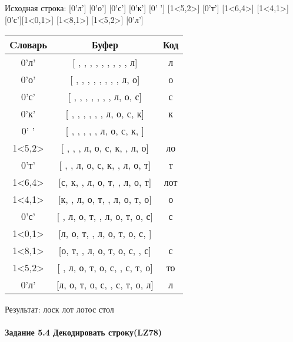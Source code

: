 \documentclass[a4paper, 12pt]{article}
\begin{document}
Исходная строка: [0'л'] [0'о'] [0'с'] [0'к'] [0' '] [1<5,2>] [0'т'] [1<6,4>] [1<4,1>] [0'с'][1<0,1>] [1<8,1>] [1<5,2>] [0'л']\\
\begin{table}[h!]
\centering
\begin{tabular}{|c|c|c|}
\hline
 Cловарь & Буфер & Код  \\ \hline
0'л' & [ ,  ,  ,  ,  ,  ,  ,  ,  , л] & л
\\ \hline
0'о' & [ ,  ,  ,  ,  ,  ,  ,  , л, о] & о
\\ \hline
0'с' & [ ,  ,  ,  ,  ,  ,  , л, о, с] & с
\\ \hline
0'к' & [ ,  ,  ,  ,  ,  , л, о, с, к] & к
\\ \hline
0' ' & [ ,  ,  ,  ,  , л, о, с, к,  ] &  
\\ \hline
1<5,2> & [ ,  ,  , л, о, с, к,  , л, о] & ло
\\ \hline
0'т' & [ ,  , л, о, с, к,  , л, о, т] & т
\\ \hline
1<6,4> & [с, к,  , л, о, т,  , л, о, т] &  лот
\\ \hline
1<4,1> & [к,  , л, о, т,  , л, о, т, о] & о
\\ \hline
0'с' & [ , л, о, т,  , л, о, т, о, с] & с
\\ \hline
1<0,1> & [л, о, т,  , л, о, т, о, с,  ] &  
\\ \hline
1<8,1> & [о, т,  , л, о, т, о, с,  , с] & с
\\ \hline
1<5,2> & [ , л, о, т, о, с,  , с, т, о] & то
\\ \hline
0'л' & [л, о, т, о, с,  , с, т, о, л] & л
\\ \hline
\end{tabular}
\end{table}

Результат: лоск лот лотос стол
\pagebreak
\paragraph{Задание 5.4 Декодировать строку(LZ78)\\}
\end{document}
